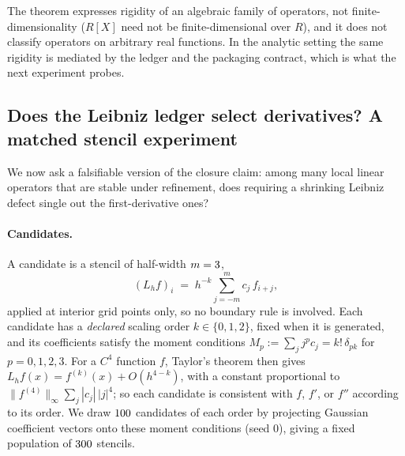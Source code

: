 The theorem expresses rigidity of an algebraic family of operators, not finite-dimensionality ($R[X]$ need not be finite-dimensional over $R$), and it does not classify operators on arbitrary real functions.
In the analytic setting the same rigidity is mediated by the ledger and the packaging contract, which is what the next experiment probes.

\subsection{Does the Leibniz ledger select derivatives? A matched stencil experiment}
\label{subsec:stencils}
We now ask a falsifiable version of the closure claim: among many local linear operators that are stable under refinement, does requiring a shrinking Leibniz defect single out the first-derivative ones?

\paragraph{Candidates.}
A candidate is a stencil of half-width $m=3$,
\[
  (L_hf)_i\;=\;h^{-k}\sum_{j=-m}^{m}c_j\,f_{i+j},
\]
applied at interior grid points only, so no boundary rule is involved.
Each candidate has a \emph{declared} scaling order $k\in\{0,1,2\}$, fixed when it is generated, and its coefficients satisfy the moment conditions $M_p:=\sum_jj^pc_j=k!\,\delta_{pk}$ for $p=0,1,2,3$.
For a $C^4$ function $f$, Taylor's theorem then gives $L_hf(x)=f^{(k)}(x)+O(h^{4-k})$, with a constant proportional to $\|f^{(4)}\|_\infty\sum_j|c_j|\,|j|^4$; so each candidate is consistent with $f$, $f'$, or $f''$ according to its order.
We draw $100$ candidates of each order by projecting Gaussian coefficient vectors onto these moment conditions (seed $0$), giving a fixed population of $300$ stencils.

